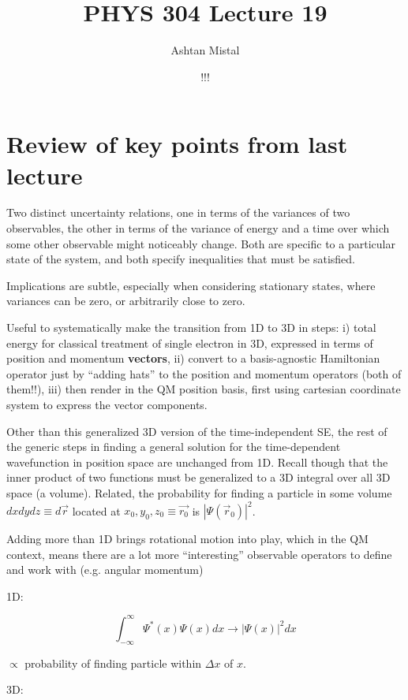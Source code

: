 \documentclass{article}
\title{PHYS 304 Lecture 19}
\author{Ashtan Mistal}
\date{!!!}
\begin{document}
\ifstandalone
\maketitle
\fi

\graphicspath{{./Lecture19/}}

\section{Review of key points from last lecture}

Two distinct uncertainty relations, one in terms of the variances of two observables, the other in terms of the variance of energy and a time over which some other observable might noticeably change.  Both are specific to a particular state of the system, and both specify inequalities that must be satisfied.

Implications are subtle, especially when considering stationary states, where variances can be zero, or arbitrarily close to zero.

Useful to systematically make the transition from 1D to 3D in steps: i) total energy for classical treatment of single electron in 3D, expressed in terms of position and momentum \textbf{vectors}, ii) convert to a basis-agnostic Hamiltonian operator just by “adding hats” to the position and momentum operators (both of them!!), iii) then render in the QM position basis, first using cartesian coordinate system to express the vector components. 

Other than this generalized 3D version of the time-independent SE, the rest of the generic steps in finding a general solution for the time-dependent wavefunction in position space are unchanged from 1D. Recall though that the inner product of two functions must be generalized to a 3D integral over all 3D space (a volume).  Related, the probability for finding a particle in some volume $dx dy dz \equiv d \vec{r}$ located at $x_0, y_0, z_0 \equiv \vec{r_0}$ is $|\Psi(\vec{r}_0)|^2$. 

Adding more than 1D brings rotational motion into play, which in the QM context, means there are a lot more “interesting” observable operators to define and work with (e.g. angular momentum)

1D:

$$\int_{- \infty}^\infty \Psi^*(x) \Psi(x) dx \rightarrow |\Psi(x)|^2 dx$$

$\propto$ probability of finding particle within $\Delta x$ of $x$. 

3D:
\end{document}
